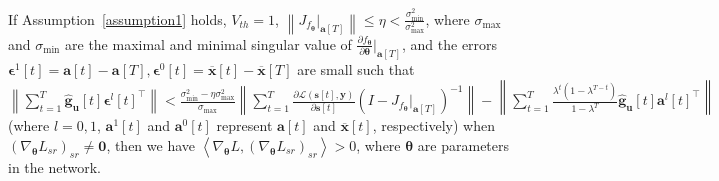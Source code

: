 \documentclass{article}
\begin{document}
\begin{thm}\label{thm_recurrent}
If Assumption~\ref{assumption1} holds, $V_{th}=1$, $\left\lVert J_{f_{\bm{\theta}}}\vert_{\mathbf{a}[T]} \right\rVert \leq \eta < \frac{\sigma_{\text{min}}^2}{\sigma_{\text{max}}^2}$, where $\sigma_{\text{max}}$ and $\sigma_{\text{min}}$ are the maximal and minimal singular value of $\frac{\partial f_{\bm{\theta}}}{\partial \bm{\theta}}\vert_{\mathbf{a}[T]}$, and the errors $\bm{\epsilon}^1[t]=\mathbf{a}[t]-\mathbf{a}[T], \bm{\epsilon}^0[t]=\overline{\mathbf{x}}[t]-\overline{\mathbf{x}}[T]$ are small such that $\left\lVert \sum_{t=1}^T \hat{\mathbf{g}}_{\mathbf{u}}[t] {\bm{\epsilon}^l[t]}^\top  \right\rVert < \frac{\sigma_{\text{min}}^2-\eta \sigma_{\text{max}}^2}{\sigma_{\text{max}}}\left\lVert \sum_{t=1}^T \frac{\partial \mathcal{L}(\mathbf{s}[t], \mathbf{y})}{\partial \mathbf{s}[t]} \left(I-J_{f_{\bm{\theta}}}\vert_{\mathbf{a}[T]}\right)^{-1} \right\rVert - \left\lVert \sum_{t=1}^T \frac{\lambda^t(1-\lambda^{T-t})}{1-\lambda^T}\hat{\mathbf{g}}_{\mathbf{u}}[t] {\mathbf{a}^l[t]}^\top  \right\rVert$ (where $l=0,1$, $\mathbf{a}^1[t]$ and $\mathbf{a}^0[t]$ represent $\mathbf{a}[t]$ and $\overline{\mathbf{x}}[t]$, respectively) when $\left(\nabla_{\bm{\theta}}L_{sr}\right)_{sr}\neq\mathbf{0}$, then we have $\left<\nabla_{\bm{\theta}}L, \left(\nabla_{\bm{\theta}}L_{sr}\right)_{sr}\right> > 0$, where $\bm{\theta}$ are parameters in the network.
\end{thm}
\vspace{-1mm}

\vspace{-2mm}
\end{document}
